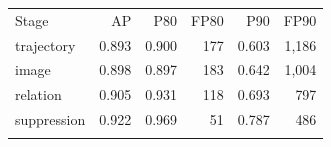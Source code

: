 \begin{tabular}{lrrrrr}
\tophline
Stage & AP & P80 & FP80 & P90 & FP90 \\
\middlehline
trajectory & 0.893 & 0.900 & 177 & 0.603 & 1,186 \\
image & 0.898 & 0.897 & 183 & 0.642 & 1,004 \\
relation & 0.905 & 0.931 & 118 & 0.693 & 797 \\
suppression & 0.922 & 0.969 & 51 & 0.787 & 486 \\
\bottomhline
\end{tabular}
